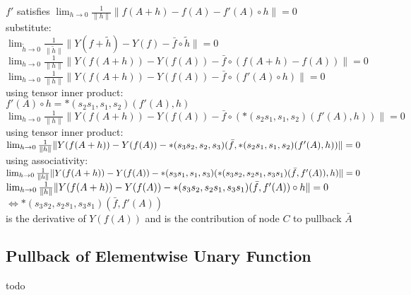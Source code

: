 \documentclass[8pt]{extarticle}
\begin{document}
\begin{multicols*}{2}
  $f'$ satisfies $\lim_{h \rightarrow 0} \frac{1}{\| h \|} \| f(A+h) - f(A) - f'(A) \circ h \| = 0$\\

  substitute:\\
  $\lim_{\tilde{h} \rightarrow 0} \frac{1}{\| \tilde{h} \|} \|Y(f+\tilde{h}) - Y(f) - \bar{f} \circ \tilde{h} \| = 0$\\
  $\lim_{h \rightarrow 0} \frac{1}{\| h \|} \|Y(f(A+h)) - Y(f(A)) - \bar{f} \circ (f(A+h) - f(A))\| = 0$\\
  $\lim_{h \rightarrow 0} \frac{1}{\| h \|} \|Y(f(A+h)) - Y(f(A)) - \bar{f} \circ (f'(A) \circ h)\| = 0$\\

  using tensor inner product:\\
  $f'(A) \circ h = *(s_2 s_1, s_1, s_2)(f'(A), h)$\\
  $\lim_{h \rightarrow 0} \frac{1}{\| h \|} \|Y(f(A+h)) - Y(f(A)) - \bar{f} \circ (*(s_2 s_1, s_1, s_2)(f'(A), h))\| = 0$\\

  using tensor inner product:\\
  $\lim_{h \rightarrow 0} \frac{1}{\| h \|} \|Y(f(A+h)) - Y(f(A)) \\ - *(s_3 s_2, s_2, s_3)(\bar{f}, *(s_2 s_1, s_1, s_2)(f'(A), h))\| = 0$\\

  using associativity:\\
  $\lim_{h \rightarrow 0} \frac{1}{\| h \|} \|Y(f(A+h)) - Y(f(A)) \\ - *(s_3 s_1, s_1, s_3)(*(s_3 s_2, s_2 s_1, s_3 s_1)(\bar{f}, f'(A)), h) \| = 0$\\
  
  $\lim_{h \rightarrow 0} \frac{1}{\| h \|} \|Y(f(A+h)) - Y(f(A)) \\ - *(s_3 s_2, s_2 s_1, s_3 s_1)(\bar{f}, f'(A)) \circ h \| = 0$\\
  $\iff *(s_3 s_2, s_2 s_1, s_3 s_1)(\bar{f}, f'(A))$\\
  is the derivative of $Y(f(A))$ and is the contribution of node $C$ to pullback $\bar{A}$
  
  \vfill\null
  \pagebreak
    
  \subsection{Pullback of Elementwise Unary Function}
  todo
  
  \vfill\null
  \columnbreak
  

\end{multicols*}
\end{document}
